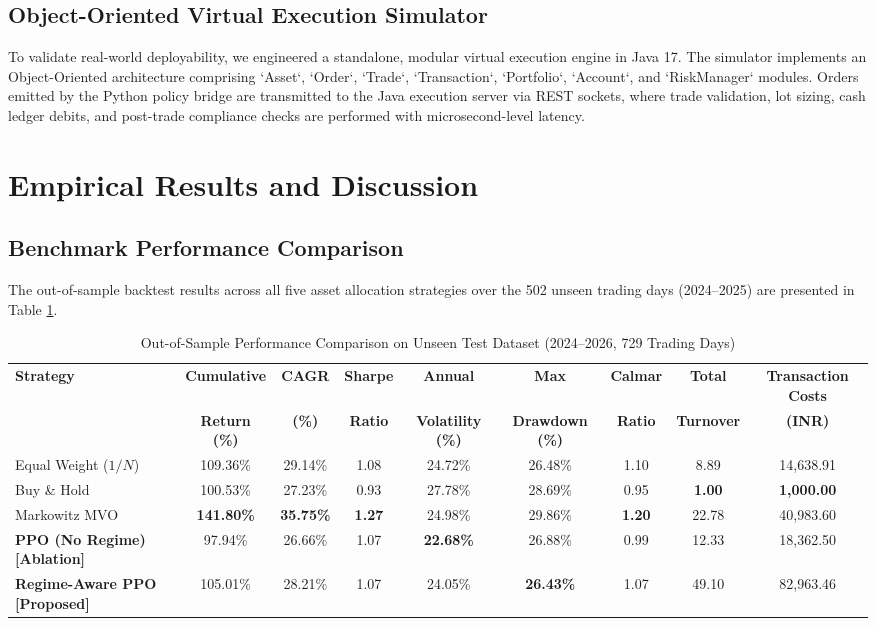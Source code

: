 \documentclass[conference]{IEEEtran}
\begin{document}
\subsection{Object-Oriented Virtual Execution Simulator}
To validate real-world deployability, we engineered a standalone, modular virtual execution engine in Java 17. The simulator implements an Object-Oriented architecture comprising `Asset`, `Order`, `Trade`, `Transaction`, `Portfolio`, `Account`, and `RiskManager` modules. Orders emitted by the Python policy bridge are transmitted to the Java execution server via REST sockets, where trade validation, lot sizing, cash ledger debits, and post-trade compliance checks are performed with microsecond-level latency.

\section{Empirical Results and Discussion}

\subsection{Benchmark Performance Comparison}
The out-of-sample backtest results across all five asset allocation strategies over the 502 unseen trading days (2024--2025) are presented in Table \ref{tab:results}.

\begin{table}[t]
\caption{Out-of-Sample Performance Comparison on Unseen Test Dataset (2024--2026, 729 Trading Days)}
\label{tab:results}
\centering
\begin{tabular}{lcccccccc}
\toprule
\textbf{Strategy} & \textbf{Cumulative} & \textbf{CAGR} & \textbf{Sharpe} & \textbf{Annual} & \textbf{Max} & \textbf{Calmar} & \textbf{Total} & \textbf{Transaction Costs} \\
 & \textbf{Return (\%)} & \textbf{(\%)} & \textbf{Ratio} & \textbf{Volatility (\%)} & \textbf{Drawdown (\%)} & \textbf{Ratio} & \textbf{Turnover} & \textbf{(INR)} \\
\midrule
Equal Weight ($1/N$) & 109.36\% & 29.14\% & 1.08 & 24.72\% & 26.48\% & 1.10 & 8.89 & 14,638.91 \\
Buy \& Hold & 100.53\% & 27.23\% & 0.93 & 27.78\% & 28.69\% & 0.95 & \textbf{1.00} & \textbf{1,000.00} \\
Markowitz MVO & \textbf{141.80\%} & \textbf{35.75\%} & \textbf{1.27} & 24.98\% & 29.86\% & \textbf{1.20} & 22.78 & 40,983.60 \\
\midrule
\textbf{PPO (No Regime) [Ablation]} & 97.94\% & 26.66\% & 1.07 & \textbf{22.68\%} & 26.88\% & 0.99 & 12.33 & 18,362.50 \\
\textbf{Regime-Aware PPO [Proposed]} & 105.01\% & 28.21\% & 1.07 & 24.05\% & \textbf{26.43\%} & 1.07 & 49.10 & 82,963.46 \\
\bottomrule
\end{tabular}
\end{table}
\end{document}
